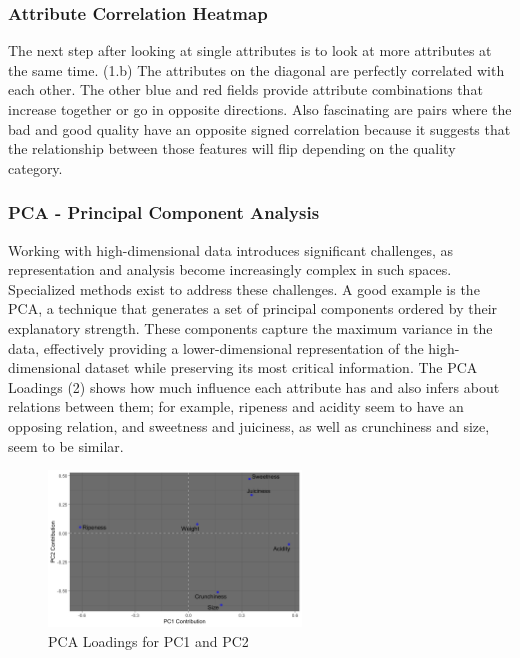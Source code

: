 \documentclass[
]{report}
\begin{document}
\subsubsection{Attribute Correlation
Heatmap}\label{attribute-correlation-heatmap}

The next step after looking at single attributes is to look at more
attributes at the same time. (1.b) The attributes on the diagonal are
perfectly correlated with each other. The other blue and red fields
provide attribute combinations that increase together or go in opposite
directions. Also fascinating are pairs where the bad and good quality
have an opposite signed correlation because it suggests that the
relationship between those features will flip depending on the quality
category.

\subsubsection{PCA - Principal Component
Analysis}\label{pca---principal-component-analysis}

Working with high-dimensional data introduces significant challenges, as
representation and analysis become increasingly complex in such spaces.
Specialized methods exist to address these challenges. A good example is
the PCA, a technique that generates a set of principal components
ordered by their explanatory strength. These components capture the
maximum variance in the data, effectively providing a lower-dimensional
representation of the high-dimensional dataset while preserving its most
critical information. The PCA Loadings (2) shows how much influence each
attribute has and also infers about relations between them; for example,
ripeness and acidity seem to have an opposing relation, and sweetness
and juiciness, as well as crunchiness and size, seem to be similar.

\begin{figure}[h]
  \centering
  \includegraphics[width=0.6\textwidth]{images/PCA3.png}
  \caption{PCA Loadings for PC1 and PC2}
  \label{fig:pca_combined}
\end{figure}
\end{document}

